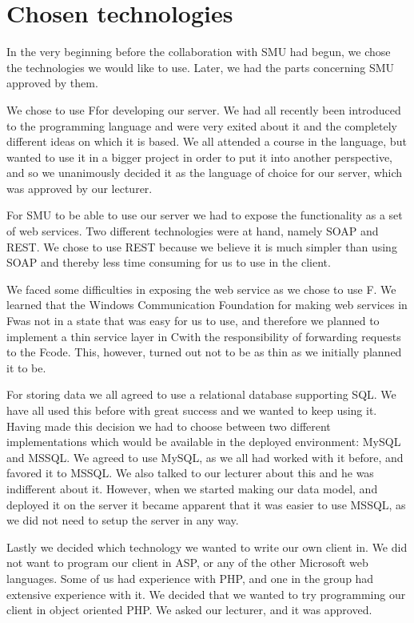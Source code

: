 \section{Chosen technologies}
In the very beginning before the collaboration with SMU had begun, we chose the technologies we would like to use. Later, we had the parts concerning SMU approved by them.

We chose to use F\Sh for developing our server. We had all recently been introduced to the programming language and were very exited about it and the completely different ideas on which it is based.
We all attended a course in the language, but wanted to use it in a bigger project in order to put it into another perspective, and so we unanimously decided it as the language of choice for our server, which was approved by our lecturer.

For SMU to be able to use our server we had to expose the functionality as a set of web services. Two different technologies were at hand, namely SOAP and REST.
We chose to use REST because we believe it is much simpler than using SOAP and thereby less time consuming for us to use in the client.

We faced some difficulties in exposing the web service as we chose to use F\Sh.
We learned that the Windows Communication Foundation for making web services in F\Sh was not in a state that was easy for us to use, and therefore we planned to implement a thin service layer in C\Sh with the responsibility of forwarding requests to the F\Sh code. This, however, turned out not to be as thin as we initially planned it to be.

For storing data we all agreed to use a relational database supporting SQL. We have all used this before with great success and we wanted to keep using it.
Having made this decision we had to choose between two different implementations which would be available in the deployed environment: MySQL and MSSQL. We agreed to use MySQL, as we all had worked with it before, and favored it to MSSQL. We also talked to our lecturer about this and he was indifferent about it. However, when we started making our data model, and deployed it on the server it became apparent that it was easier to use MSSQL, as we did not need to setup the server in any way.

Lastly we decided which technology we wanted to write our own client in. We did not want to program our client in ASP, or any of the other Microsoft web languages. Some of us had experience with PHP, and one in the group had extensive experience with it. We decided that we wanted to try programming our client in object oriented PHP. We asked our lecturer, and it was approved.
\newpage